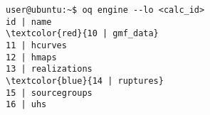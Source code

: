 \begin{Verbatim}[frame=single, commandchars=\\\{\}, fontsize=\small]
user@ubuntu:~$ oq engine --lo <calc_id>
id | name
\textcolor{red}{10 | gmf_data}
11 | hcurves
12 | hmaps
13 | realizations
\textcolor{blue}{14 | ruptures}
15 | sourcegroups
16 | uhs
\end{Verbatim}
